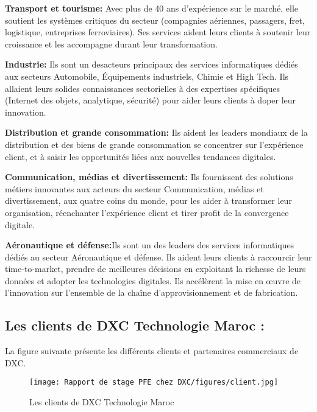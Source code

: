 \begin{description}
  \item \textbf{Transport et tourisme:} Avec plus de 40 ans d’expérience sur le marché, elle soutient les systèmes critiques du secteur (compagnies aériennes, passagers, fret, logistique, entreprises ferroviaires). Ses services aident leurs clients à soutenir leur croissance et les accompagne durant leur transformation.
  \item \textbf{Industrie:} Ils sont un desacteurs principaux des services informatiques dédiés aux secteurs Automobile, Équipements industriels, Chimie et High Tech. Ils allaient leurs solides connaissances sectorielles à des expertises spécifiques (Internet des objets, analytique, sécurité) pour aider leurs clients à doper leur innovation.
  \item \textbf{Distribution et grande consommation:} Ils aident les leaders mondiaux de la distribution et des biens de grande consommation se concentrer sur l’expérience client, et à saisir les opportunités liées aux nouvelles tendances digitales.
  \item \textbf{Communication, médias et divertissement:} Ils fournissent des solutions métiers innovantes aux acteurs du secteur Communication, médias et divertissement, aux quatre coins du monde, pour les aider à transformer leur organisation, réenchanter l’expérience client et tirer profit de la convergence digitale.
  \item \textbf{Aéronautique et défense:}Ils sont un des leaders des services informatiques dédiés au secteur Aéronautique et défense. Ils aident leurs clients à raccourcir leur time-to-market, prendre de meilleures décisions en exploitant la richesse de leurs données et adopter les technologies digitales. Ils accélèrent la mise en œuvre de l’innovation sur l’ensemble de la chaîne d’approvisionnement et de fabrication.
  
\end{description}

\subsection{Les clients de DXC Technologie Maroc :}

La figure suivante présente les différents clients et partenaires commerciaux de DXC.

\begin{figure}[!h]
    \centering
    \texttt{[image: Rapport de stage PFE chez DXC/figures/client.jpg]}
    \caption{Les clients de DXC Technologie Maroc}
\end{figure}
\newpage
